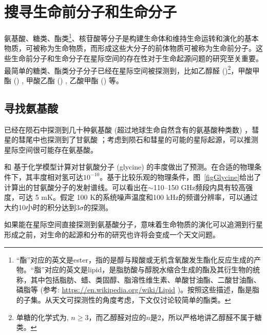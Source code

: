 \documentclass[a4paper]{article}
\newcommand{\reffig}[1]{图~\ref{#1}}
\begin{document}
\section{搜寻生命前分子和生命分子}

氨基酸、糖类、酯类\footnote{“酯”对应的英文是ester，指的是醇与羧酸或无机含氧酸发生酯化反应生成的产物。“脂”对应的英文是lipid，是脂肪酸与醇脱水缩合生成的酯及其衍生物的统称，其中包括脂肪、蜡、类固醇、脂溶性维生素、单酸甘油酯、二酸甘油酯、磷脂等 (参考: \url{https://en.wikipedia.org/wiki/Lipid}%
)。按照这些描述，酯是脂的子集。从天文可探测性的角度考虑，下文仅讨论较简单的酯类。}、核苷酸等分子是构建生命体和维持生命运转和演化的基本物质，可被称为生命物质，而形成这些大分子的前体物质可被称为生命前分子。这些生命前分子和生命分子在星际空间的存在性对于生命起源问题的研究至关重要。最简单的糖类、酯类分子分子已经在星际空间被探测到，比如乙醇醛 ()\footnote{单糖的化学式为, $n\ge3$，而乙醇醛对应的$n$是2，所以严格地讲乙醇醛不属于糖类。}\citep{Hollis2000,Jorgensen2012}，甲酸甲酯 () \citep{Sakai2006}, 甲酸乙酯 () \citep{Belloche2009}, 乙酸甲酯 () \citep{Tercero2013} 等。

\subsection{寻找氨基酸}
已经在陨石中探测到几十种氨基酸 (超过地球生命自然含有的氨基酸种类数) \citep{Kvenvolden1970,Schmitt2010}，彗星的彗尾中也探测到了甘氨酸 \citep{Altwegg2016}；考虑到陨石和彗星的可能的星际起源，可以推测星际空间很可能存在氨基酸。

\citet{Garrod2013} 和 \citet{Suzuki2018}基于化学模型计算对甘氨酸分子 (glycine) 的丰度做出了预测。在合适的物理条件下，其丰度相对氢可达$10^{-10}$。基于比较乐观的物理条件，\reffig{figGlycine}给出了计算出的甘氨酸分子的发射谱线。可以看出在$\sim$110--150 GHz频段内具有较高强度，可达 5 mK。假定 100 K的系统噪声温度和100 kHz的频谱分辨率，可以通过大约10小时的积分达到$3\sigma$的探测。

如果能在星际空间直接探测到氨基酸分子，意味着生命物质的演化可以追溯到行星形成之前，对生命的起源和分布的研究也许将会变成一个天文问题。
\end{document}
